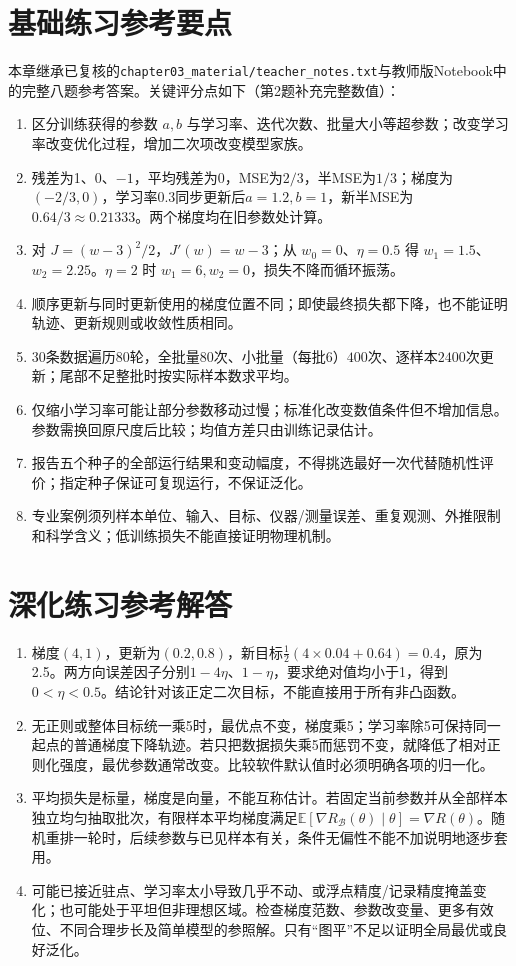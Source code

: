 \section*{基础练习参考要点}
\noindent 本章继承已复核的\texttt{chapter03\_material/teacher\_notes.txt}与教师版Notebook中的完整八题参考答案。关键评分点如下（第2题补充完整数值）：\par
\begin{enumerate}[label=\arabic*.]
\item 区分训练获得的参数 $a,b$ 与学习率、迭代次数、批量大小等超参数；改变学习率改变优化过程，增加二次项改变模型家族。
\item 残差为1、0、$-1$，平均残差为0，MSE为$2/3$，半MSE为$1/3$；梯度为$(-2/3,0)$，学习率0.3同步更新后$a=1.2,b=1$，新半MSE为$0.64/3\approx0.21333$。两个梯度均在旧参数处计算。
\item 对 $J=(w-3)^2/2$，$J'(w)=w-3$；从 $w_0=0$、$\eta=0.5$ 得 $w_1=1.5$、$w_2=2.25$。$\eta=2$ 时 $w_1=6,w_2=0$，损失不降而循环振荡。
\item 顺序更新与同时更新使用的梯度位置不同；即使最终损失都下降，也不能证明轨迹、更新规则或收敛性质相同。
\item $30$条数据遍历$80$轮，全批量$80$次、小批量（每批6）$400$次、逐样本$2400$次更新；尾部不足整批时按实际样本数求平均。
\item 仅缩小学习率可能让部分参数移动过慢；标准化改变数值条件但不增加信息。参数需换回原尺度后比较；均值方差只由训练记录估计。
\item 报告五个种子的全部运行结果和变动幅度，不得挑选最好一次代替随机性评价；指定种子保证可复现运行，不保证泛化。
\item 专业案例须列样本单位、输入、目标、仪器/测量误差、重复观测、外推限制和科学含义；低训练损失不能直接证明物理机制。
\end{enumerate}
\section*{深化练习参考解答}
\begin{enumerate}[label=D\arabic*.]
\item 梯度$(4,1)$，更新为$(0.2,0.8)$，新目标$\frac12(4\times0.04+0.64)=0.4$，原为2.5。两方向误差因子分别$1-4\eta$、$1-\eta$，要求绝对值均小于1，得到$0<\eta<0.5$。结论针对该正定二次目标，不能直接用于所有非凸函数。
\item 无正则或整体目标统一乘5时，最优点不变，梯度乘5；学习率除5可保持同一起点的普通梯度下降轨迹。若只把数据损失乘5而惩罚不变，就降低了相对正则化强度，最优参数通常改变。比较软件默认值时必须明确各项的归一化。
\item 平均损失是标量，梯度是向量，不能互称估计。若固定当前参数并从全部样本独立均匀抽取批次，有限样本平均梯度满足$\mathbb E[\nabla R_{\mathcal B}(\theta)\mid\theta]=\nabla R(\theta)$。随机重排一轮时，后续参数与已见样本有关，条件无偏性不能不加说明地逐步套用。
\item 可能已接近驻点、学习率太小导致几乎不动、或浮点精度/记录精度掩盖变化；也可能处于平坦但非理想区域。检查梯度范数、参数改变量、更多有效位、不同合理步长及简单模型的参照解。只有“图平”不足以证明全局最优或良好泛化。
\end{enumerate}

